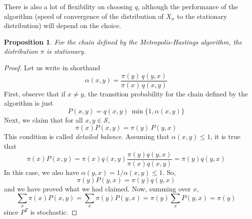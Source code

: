 \documentclass{article}
\newtheorem{proposition}[theorem]{Proposition}
\theoremstyle{remark}
\theoremstyle{definition}
\begin{document}
There is also a lot of flexibility on choosing $q$, although the performance of the algorithm (speed of convergence of the distribution of $X_n$ to the stationary distribution) will depend on the choice.

\begin{proposition}
For the chain defined by the Metropolis-Hastings algorithm, the distribution $\pi$ is stationary. 
\end{proposition}
\begin{proof}
Let us write in shorthand 
\[\alpha(x, y) = \frac{\pi(y)\, q(y, x)}{\pi(x)\, q(x, y)}\]
First, observe that if $x \neq y$, the transition probability for the chain defined by the algorithm is just
\[P(x, y) = q(x, y)\, \min\{1, \alpha(x, y)\}\]
Next, we claim that for all $x, y \in \mathcal{S}$, 
\[\pi(x) P(x, y) = \pi(y) \, P(y, x) \]
This condition is called \textit{detailed balance}. Assuming that $\alpha(x, y) \leq 1$, it is true that
\[\pi(x) P(x, y) = \pi(x) q(x, y) \frac{\pi(y) q(y, x)}{\pi(x) q(x, y)} = \pi(y) q(y, x)\]
In this case, we also have $\alpha(y, x) = 1 / \alpha(x, y) \leq 1$. So, 
\[\pi(y) P(y, x) = \pi(y) q(y, x) \]
and we have proved what we had claimed. Now, summing over $x$,
\[\sum_x \pi(x) P(x, y) = \sum_x \pi(y) P(y, x) = \pi(y) \sum_x P(y, x) = \pi(y)\]
since $P^T$ is stochastic. 
\end{proof}
\end{document}
